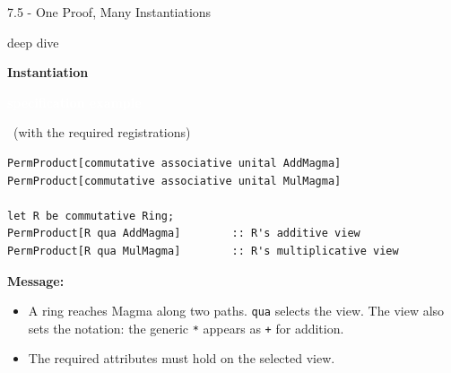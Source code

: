 \documentclass[aspectratio=169,11pt]{beamer}
\newcommand{\statusbadge}[2]{\colorbox{#1}{\textcolor{white}{\strut\scriptsize\sffamily\bfseries #2}}}
\newcommand{\badgeSpec}{\statusbadge{green!35!black}{specification example}}
\newcommand{\deepdivetag}{\hfill\colorbox{black!15}{\textcolor{black!65}{\strut\scriptsize\sffamily deep dive}}}
\begin{document}
\begin{frame}[fragile,t]{7.5 - One Proof, Many Instantiations\deepdivetag}
\smallskip
\textbf{Instantiation}~\badgeSpec~{\footnotesize(with the required registrations)}
\begin{lstlisting}[language={mizar},basicstyle=\ttfamily\small]
PermProduct[commutative associative unital AddMagma]
PermProduct[commutative associative unital MulMagma]

let R be commutative Ring;
PermProduct[R qua AddMagma]        :: R's additive view
PermProduct[R qua MulMagma]        :: R's multiplicative view
\end{lstlisting}
\smallskip
\textbf{Message:}
\begin{itemize}
\setlength{\itemsep}{1pt}
\setlength{\parsep}{0pt}
\setlength{\parskip}{0pt}
\item A ring reaches Magma along two paths. \texttt{qua} selects the view. The view also sets the notation: the generic \texttt{*} appears as \texttt{+} for addition.
\item The required attributes must hold on the selected view.
\end{itemize}
\end{frame}
\end{document}
